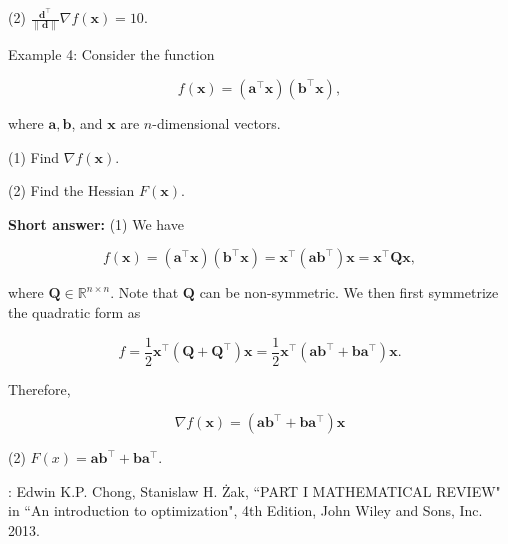 (2) \(\frac{\boldsymbol{d}^{\top}}{\|\boldsymbol{d}\|} \nabla f(\boldsymbol{x})=10\).


\bigskip
\noindent
Example 4: Consider the function

\begin{equation*}
	f(\boldsymbol{x})=\left(\boldsymbol{a}^{\top} \boldsymbol{x}\right)\left(\boldsymbol{b}^{\top} \boldsymbol{x}\right),
\end{equation*}

where \(\boldsymbol{a}, \boldsymbol{b}\), and \(\boldsymbol{x}\) are \(n\)-dimensional vectors.

(1) Find \(\nabla f(\boldsymbol{x})\).

(2) Find the Hessian \(F(\boldsymbol{x})\).

\noindent
\textbf{Short answer:}
(1) We have

\begin{equation*}
	f(\boldsymbol{x})=\left(\boldsymbol{a}^{\top} \boldsymbol{x}\right)\left(\boldsymbol{b}^{\top} \boldsymbol{x}\right)=\boldsymbol{x}^{\top}\left(\boldsymbol{a} \boldsymbol{b}^{\top}\right) \boldsymbol{x}=\boldsymbol{x}^{\top} \boldsymbol{Q} \boldsymbol{x},
\end{equation*}

where \(\boldsymbol{Q} \in \mathbb{R}^{n \times n}\). Note that \(\boldsymbol{Q}\) can be non-symmetric. We then first symmetrize the quadratic form as

\begin{equation*}
	f=\frac{1}{2} \boldsymbol{x}^{\top}\left(\boldsymbol{Q}+\boldsymbol{Q}^{\top}\right) \boldsymbol{x}=\frac{1}{2} \boldsymbol{x}^{\top}\left(\boldsymbol{a} \boldsymbol{b}^{\top}+\boldsymbol{b} \boldsymbol{a}^{\top}\right) \boldsymbol{x} .
\end{equation*}

Therefore,

\begin{equation*}
	\nabla f(\boldsymbol{x})=\left(\boldsymbol{a} \boldsymbol{b}^{\top}+\boldsymbol{b} \boldsymbol{a}^{\top}\right) \boldsymbol{x}
\end{equation*}

(2) \(F(x)=\boldsymbol{a} \boldsymbol{b}^{\top}+\boldsymbol{b} \boldsymbol{a}^{\top}\).

\bigskip

\noindent
[Ref]: Edwin K.P. Chong, Stanislaw H. Żak, ``PART I MATHEMATICAL REVIEW" in ``An introduction to optimization", 4th Edition, John Wiley and Sons, Inc. 2013.

